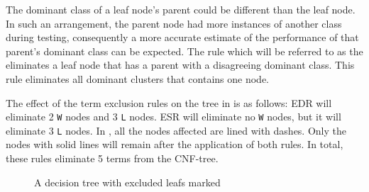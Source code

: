 The dominant class of a leaf node's parent could be different than the leaf node.  In such an arrangement, the parent node had more instances of another class during testing, consequently a more accurate estimate of the performance of that parent's dominant class can be expected. The rule which will be referred to as the  eliminates a leaf node that has a parent with a disagreeing dominant class.  This rule eliminates all dominant clusters that contains one node.  

The effect of the term exclusion rules on the tree in  is as follows: EDR will eliminate 2 {\tt W} nodes and 3 {\tt L} nodes.  ESR will eliminate no {\tt W} nodes, but it will eliminate 3 {\tt L} nodes. In , all the nodes affected are lined with dashes.  Only the nodes with solid lines will remain after the application of both rules.  In total, these rules eliminate 5 terms from the CNF-tree.
\begin{figure} [htb]
\center
\tiny
{}
{
		{
				{
						{
								{
										
										{
												{
														{
																{
																		{
																				{
																						{
																						}
																				}
																		}
																}																
														}
												}
										}
								}
						}
				}
		}
}
\caption{A decision tree with excluded leafs marked}
\label{fig:dec_trimmed_tree}
\end{figure}

